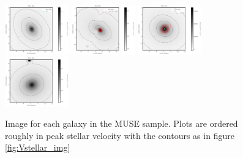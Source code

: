 \begin{figure}
      \centering
      \includegraphics[width=0.245\textwidth]{Mmaps/ic1459_stellar_img.png}
      \includegraphics[width=0.245\textwidth]{Mmaps/ngc1316_stellar_img.png}
      \includegraphics[width=0.245\textwidth]{Mmaps/ic4296_stellar_img.png}
      \includegraphics[width=0.245\textwidth]{Mmaps/ngc1399_stellar_img.png}
      \caption[MUSE images]{Image for each galaxy in the MUSE sample. Plots are ordered roughly in peak stellar velocity with the contours as in figure \ref{fig:Vstellar_img}}
      \label{fig:Mstellar_img}
\end{figure}

